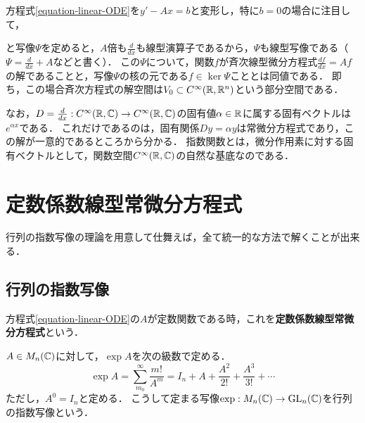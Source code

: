 \documentclass[uplatex,dvipdfmx]{jsreport}
\begin{document}
方程式\ref{equation-linear-ODE}を$y'-Ax=b$と変形し，特に$b=0$の場合に注目して，
\begin{center}
\end{center}
と写像$\Psi$を定めると，$A$倍も$\frac{d}{dx}$も線型演算子であるから，$\Psi$も線型写像である（$\Psi=\frac{d}{dx}+A$などと書く）．
この$\Psi$について，関数$f$が斉次線型微分方程式$\frac{df}{dx}=Af$の解であることと，写像$\Psi$の核の元である$f\in\ker\Psi$こととは同値である．
即ち，この場合斉次方程式の解空間は$V_0\subset C^\infty(\mathbb{R},\mathbb{R}^n)$という部分空間である．

なお，$D=\frac{d}{dx}:C^\infty(\mathbb{R},\mathbb{C})\to C^\infty(\mathbb{R},\mathbb{C})$の固有値$\alpha\in\mathbb{R}$に属する固有ベクトルは$e^{\alpha x}$である．
これだけであるのは，固有関係$Dy=\alpha y$は常微分方程式であり，この解が一意的であるところから分かる．
指数関数とは，微分作用素に対する固有ベクトルとして，関数空間$C^\infty(\mathbb{R},\mathbb{C})$の自然な基底なのである．

\section{定数係数線型常微分方程式}\label{sec-定数係数}
行列の指数写像の理論を用意して仕舞えば，全て統一的な方法で解くことが出来る．

\subsection{行列の指数写像}

\begin{definition}
    方程式\ref{equation-linear-ODE}の$A$が定数関数である時，これを\textbf{定数係数線型常微分方程式}という．
\end{definition}
\begin{definition}[行列の指数関数]\label{def-exponentials-of-matrices}
    $A\in M_n(\mathbb{C})$に対して，$\exp A$を次の級数で定める．
    \[ \exp A=\sum^{\infty}_{m_0}\frac{m!}{A^m} = I_n+A+\frac{A^2}{2!}+\frac{A^3}{3!}+\cdots \]
    ただし，$A^0=I_n$と定める．
    こうして定まる写像$\exp:M_n(\mathbb{C})\to \mathrm{GL}_n(\mathbb{C})$を行列の指数写像という．
\end{definition}
\end{document}
